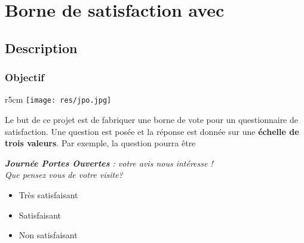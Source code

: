 
\section{Borne de satisfaction avec \mb}


%

\subsection{Description}

\subsubsection{Objectif}



\begin{wrapfigure}[3]{r}{5cm}
    \texttt{[image: res/jpo.jpg]}
\end{wrapfigure}
    
\begin{formule}
Le but de ce projet est de fabriquer une borne de vote pour un questionnaire de satisfaction. Une question est posée et la réponse est donnée sur une \textbf{échelle de trois valeurs}. Par exemple, la question pourra être \\[1em]

\begin{minipage}[t]{0.7\linewidth}
        \large\textit{\textbf{Journée Portes Ouvertes} : votre avis nous intéresse !\\Que pensez vous de votre visite?} \\[1em]
        \begin{itemize}
            \item {\LARGE\smiley} Très satisfaisant
            \item Satisfaisant
            \item {\LARGE\frownie} Non satisfaisant
        \end{itemize}        
\end{minipage}
    
\end{formule}


